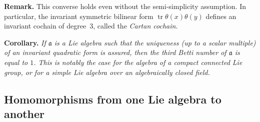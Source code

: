 \documentclass{article}
\newcommand{\fk}{\mathfrak}
\DeclareMathOperator{\tr}{tr}
\begin{document}
\medskip
\textbf{Remark.}
This converse holds even without the semi-simplicity assumption.
In particular, the invariant symmetric bilinear form $\tr\theta(x)\theta(y)$ defines an invariant cochain of degree~$3$, called the \emph{Cartan cochain}.

\medskip
\textbf{Corollary.}
{\itshape
  If $\fk{a}$ is a Lie algebra such that the \emph{uniqueness} (up to a scalar multiple) of an invariant quadratic form is assured, then the third Betti number of $\fk{a}$ is equal to $1$.
  This is notably the case for the algebra of a compact connected Lie group, or for a simple Lie algebra over an algebraically closed field.
}

\subsection{Homomorphisms from one Lie algebra to another}
\label{II.6}
\end{document}

